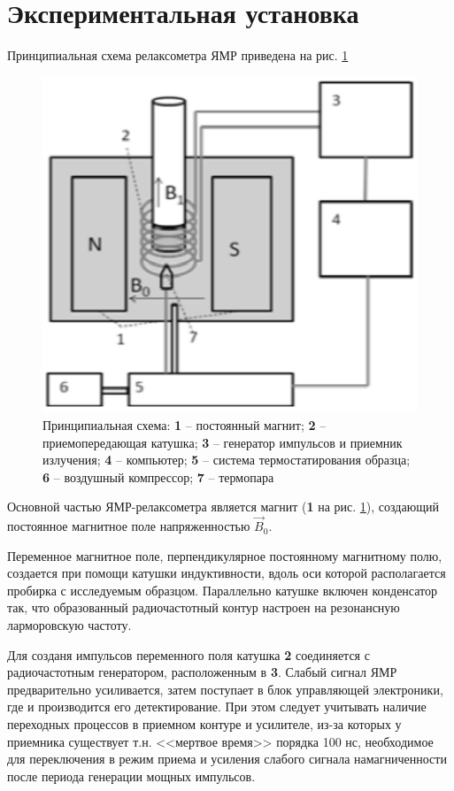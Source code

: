 \newpage
\section{Экспериментальная установка}
Принципиальная схема релаксометра ЯМР приведена на рис. \ref{fig:installation}

\begin{figure}[h]
	\centering
	\includegraphics[width=0.6\linewidth]{Installation}
	\caption{Принципиальная схема: \textbf{1} -- постоянный магнит; \textbf{2} -- приемопередающая катушка; \textbf{3} -- генератор импульсов и приемник излучения; \textbf{4} -- компьютер; \textbf{5} -- система термостатирования образца; \textbf{6} -- воздушный компрессор; \textbf{7} -- термопара}
	\label{fig:installation}
\end{figure}

Основной частью ЯМР-релаксометра является магнит (\textbf{1} на рис. \ref{fig:installation}), создающий постоянное магнитное поле напряженностью $ \vec{B}_0 $. 

Переменное магнитное поле, перпендикулярное постоянному магнитному полю, создается при помощи катушки индуктивности, вдоль оси которой располагается пробирка с исследуемым образцом. Параллельно катушке включен конденсатор так, что образованный радиочастотный контур настроен на резонансную ларморовскую частоту.

Для созданя импульсов переменного поля катушка \textbf{2} соединяется с радиочастотным генератором, расположенным в \textbf{3}. Слабый сигнал ЯМР предварительно усиливается, затем поступает в блок управляющей электроники, где и производится его детектирование. При этом следует учитывать наличие переходных процессов в приемном контуре и усилителе, из-за которых у приемника существует т.н. <<мертвое время>> порядка 100 нс, необходимое для переключения в режим приема и усиления слабого сигнала намагниченности после периода генерации мощных импульсов.

